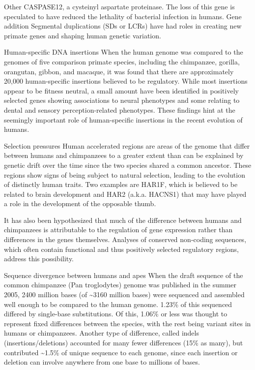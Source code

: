 Other
CASPASE12, a cysteinyl aspartate proteinase. The loss of this gene is speculated to have reduced the lethality of bacterial infection in humans.
Gene addition
Segmental duplications (SDs or LCRs) have had roles in creating new primate genes and shaping human genetic variation.

Human-specific DNA insertions
When the human genome was compared to the genomes of five comparison primate species, including the chimpanzee, gorilla, orangutan, gibbon, and macaque, it was found that there are approximately 20,000 human-specific insertions believed to be regulatory. While most insertions appear to be fitness neutral, a small amount have been identified in positively selected genes showing associations to neural phenotypes and some relating to dental and sensory perception-related phenotypes. These findings hint at the seemingly important role of human-specific insertions in the recent evolution of humans.

Selection pressures
Human accelerated regions are areas of the genome that differ between humans and chimpanzees to a greater extent than can be explained by genetic drift over the time since the two species shared a common ancestor. These regions show signs of being subject to natural selection, leading to the evolution of distinctly human traits. Two examples are HAR1F, which is believed to be related to brain development and HAR2 (a.k.a. HACNS1) that may have played a role in the development of the opposable thumb.

It has also been hypothesized that much of the difference between humans and chimpanzees is attributable to the regulation of gene expression rather than differences in the genes themselves. Analyses of conserved non-coding sequences, which often contain functional and thus positively selected regulatory regions, address this possibility.

Sequence divergence between humans and apes
When the draft sequence of the common chimpanzee (Pan troglodytes) genome was published in the summer 2005, 2400 million bases (of \textasciitilde{}3160 million bases) were sequenced and assembled well enough to be compared to the human genome. 1.23\% of this sequenced differed by single-base substitutions. Of this, 1.06\% or less was thought to represent fixed differences between the species, with the rest being variant sites in humans or chimpanzees. Another type of difference, called indels (insertions/deletions) accounted for many fewer differences (15\% as many), but contributed \textasciitilde{}1.5\% of unique sequence to each genome, since each insertion or deletion can involve anywhere from one base to millions of bases.

